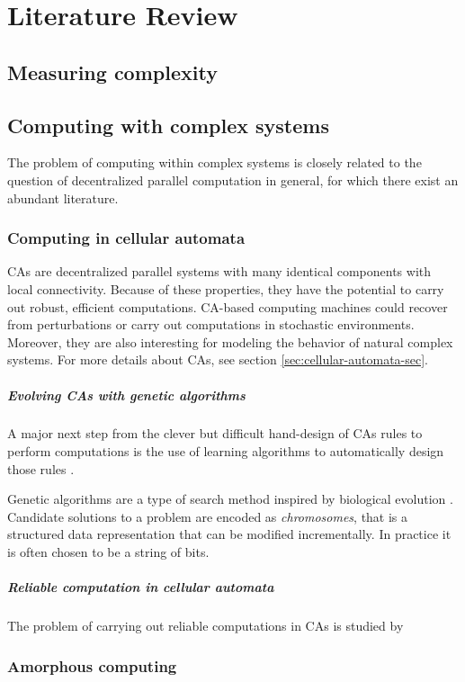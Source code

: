 \chapter{Literature Review}
\label{cha:literature-review}

\section{Measuring complexity}


\section{Computing with complex systems}

The problem of computing within complex systems is closely related to the
question of decentralized parallel computation in general, for which there exist
an abundant literature.

\subsection{Computing in cellular automata}

\Acfp{CA} are decentralized parallel systems with many identical components with
local connectivity. Because of these properties, they have the potential to
carry out robust, efficient computations. \ac{CA}-based computing machines could
recover from perturbations or carry out computations in stochastic environments.
Moreover, they are also interesting for modeling the behavior of natural complex
systems. For more details about \acp{CA}, see section
\ref{sec:cellular-automata-sec}.

\paragraph{Evolving \acp{CA} with genetic algorithms}
A major next step from the clever but difficult hand-design of \acp{CA} rules to
perform computations is the use of learning algorithms to automatically design
those rules \parencite{mitchellEvolvingCellularAutomata1996}.

Genetic algorithms are a type of search method inspired by biological evolution
\parencite{bookerClassifierSystemsGenetic1989}. Candidate solutions to a problem
are encoded as \emph{chromosomes}, that is a structured data representation that
can be modified incrementally. In practice it is often chosen to be a string of
bits.

\paragraph{Reliable computation in cellular automata}
The problem of carrying out reliable computations in \acp{CA} is studied by
\cite{gacsReliableComputationCellular1986}

\subsection{Amorphous computing}
